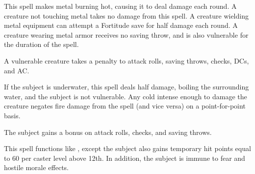 \spellrng{\rngmed}
\begin{spelleffect}
  This spell makes metal burning hot, causing it to deal damage each round. A creature not touching metal takes no damage from this spell. A creature wielding metal equipment can attempt a Fortitude save for half damage each round. A creature wearing metal armor receives no saving throw, and is also vulnerable for the duration of the spell.
\end{spelleffect}
\begin{spellnotes}
A vulnerable creature takes a  penalty to attack rolls, saving throws, checks, DCs, and AC.

  If the subject is underwater, this spell deals half damage, boiling the surrounding water, and the subject is not vulnerable. Any cold intense enough to damage the creature negates fire damage from the spell (and vice versa) on a point-for-point basis.
\end{spellnotes}

\spellrng{\rngclose}
\begin{spelleffect}
  The subject gains a  bonus on attack rolls, checks, and saving throws. \bonusscalingdescription
\end{spelleffect}

\begin{spelleffect}
  This spell functions like , except the subject also gains temporary hit points equal to 60  per caster level above 12th. In addition, the subject is immune to fear and hostile morale effects.
\end{spelleffect}

